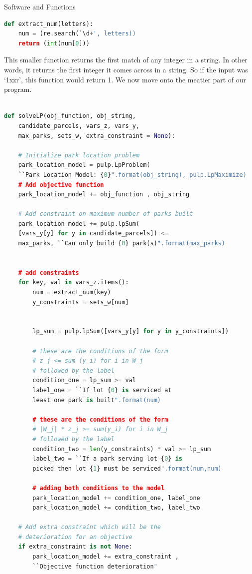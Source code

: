 \documentclass[12pt]{pom_thesis}
\theoremstyle{definition}
\begin{document}
\begin{chapter}{Software and Functions}
\begin{lstlisting}[language = Python, caption = Helper function using regex]
def extract_num(letters):
	num = (re.search(`\d+', letters))
	return (int(num[0]))
\end{lstlisting}
This smaller function returns the first match of any integer in a string. In other words, it returns the first integer it comes across in a string. So if the input was `1xzr', this function would return 1. We now move onto the meatier part of our program.\\ \\

\begin{lstlisting}[language = Python, caption = Constructs and solves our linear programs., xleftmargin = -50pt]
def solveLP(obj_function, obj_string, 
	candidate_parcels, vars_z, vars_y, 
	max_parks, sets_w, extra_constraint = None):

	# Initialize park location problem
	park_location_model = pulp.LpProblem(
	``Park Location Model: {0}".format(obj_string), pulp.LpMaximize)
	# Add objective function
	park_location_model += obj_function , obj_string

	# Add constraint on maximum number of parks built
	park_location_model += pulp.lpSum(
	[vars_y[y] for y in candidate_parcels]) <= 
	max_parks, ``Can only build {0} park(s)".format(max_parks)


	# add constraints
	for key, val in vars_z.items():
		num = extract_num(key)
		y_constraints = sets_w[num]


		lp_sum = pulp.lpSum([vars_y[y] for y in y_constraints])

 		# these are the conditions of the form
		# z_j <= sum (y_i) for i in W_j
		# followed by the label
		condition_one = lp_sum >= val
		label_one = ``If lot {0} is serviced at 
		least one park is built".format(num)

		# these are the conditions of the form 
		# |W_j| * z_j >= sum(y_i) for i in W_j
		# followed by the label
		condition_two = len(y_constraints) * val >= lp_sum
		label_two = ``If a park serving lot {0} is 
		picked then lot {1} must be serviced".format(num,num)

		# adding both conditions to the model
		park_location_model += condition_one, label_one
		park_location_model += condition_two, label_two

	# Add extra constraint which will be the 
	# deterioration for an objective
	if extra_constraint is not None: 
		park_location_model += extra_constraint , 
		``Objective function deterioration"


\end{lstlisting}
\end{chapter}
\end{document}
